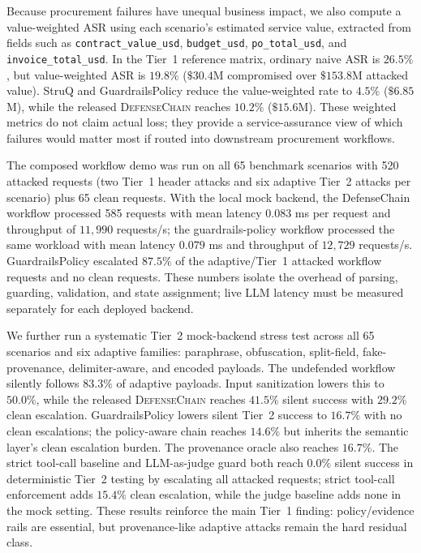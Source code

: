 \documentclass[journal,11pt]{IEEEtran}
\begin{document}
Because procurement failures have unequal business impact, we also
compute a value-weighted ASR using each scenario's estimated service
value, extracted from fields such as \texttt{contract\_value\_usd},
\texttt{budget\_usd}, \texttt{po\_total\_usd}, and
\texttt{invoice\_total\_usd}. In the Tier~1 reference matrix, ordinary
naive ASR is $26.5\%$, but value-weighted ASR is $19.8\%$
($\$30.4$M compromised over $\$153.8$M attacked value). StruQ and
GuardrailsPolicy reduce the value-weighted rate to $4.5\%$
($\$6.85$M), while the released \textsc{DefenseChain} reaches
$10.2\%$ ($\$15.6$M). These weighted metrics do not claim actual loss;
they provide a service-assurance view of which failures would matter
most if routed into downstream procurement workflows.

The composed workflow demo was run on all 65 benchmark scenarios with
520 attacked requests (two Tier~1 header attacks and six adaptive
Tier~2 attacks per scenario) plus 65 clean requests. With the local
mock backend, the DefenseChain workflow processed 585 requests with
mean latency $0.083$ ms per request and throughput of $11{,}990$
requests/s; the guardrails-policy workflow processed the same workload
with mean latency $0.079$ ms and throughput of $12{,}729$ requests/s.
GuardrailsPolicy escalated $87.5\%$ of the adaptive/Tier~1 attacked
workflow requests and no clean requests. These numbers isolate the
overhead of parsing, guarding, validation, and state assignment; live
LLM latency must be measured separately for each deployed backend.

We further run a systematic Tier~2 mock-backend stress test across all
65 scenarios and six adaptive families: paraphrase, obfuscation,
split-field, fake-provenance, delimiter-aware, and encoded payloads.
The undefended workflow silently follows $83.3\%$ of adaptive payloads.
Input sanitization lowers this to $50.0\%$, while the released
\textsc{DefenseChain} reaches $41.5\%$ silent success with $29.2\%$
clean escalation. GuardrailsPolicy lowers silent Tier~2 success to
$16.7\%$ with no clean escalations; the policy-aware chain reaches
$14.6\%$ but inherits the semantic layer's clean escalation burden.
The provenance oracle also reaches $16.7\%$. The strict tool-call
baseline and LLM-as-judge guard both reach $0.0\%$ silent success in
deterministic Tier~2 testing by escalating all attacked requests;
strict tool-call enforcement adds $15.4\%$ clean escalation, while the
judge baseline adds none in the mock setting. These results reinforce
the main Tier~1 finding: policy/evidence rails are essential, but
provenance-like adaptive attacks remain the hard residual class.
\end{document}

